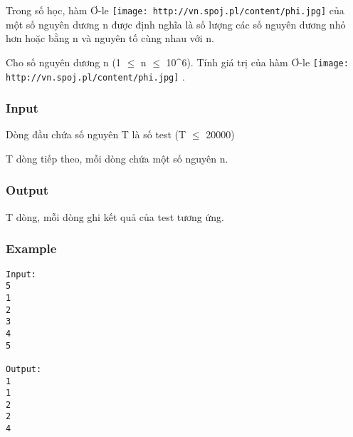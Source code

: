 



   Trong số học, hàm Ơ-le   
\texttt{[image: http://vn.spoj.pl/content/phi.jpg]}   của một số nguyên dương n được định nghĩa là số lượng các số nguyên dương nhỏ hơn hoặc bằng n và nguyên tố cùng nhau với n.  

   Cho số nguyên dương n (1  $\le$  n  $\le$  10^6). Tính giá trị của hàm Ơ-le   
\texttt{[image: http://vn.spoj.pl/content/phi.jpg]}   .  

\subsubsection{   Input  }

   Dòng đầu chứa số nguyên T là số test (T  $\le$  20000)  

   T dòng tiếp theo, mỗi dòng chứa một số nguyên n.  

\subsubsection{   Output  }

   T dòng, mỗi dòng ghi kết quả của test tương ứng.  

\subsubsection{   Example  }
\begin{verbatim}
Input:
5
1
2
3
4
5

Output:
1
1
2
2
4

\end{verbatim}
